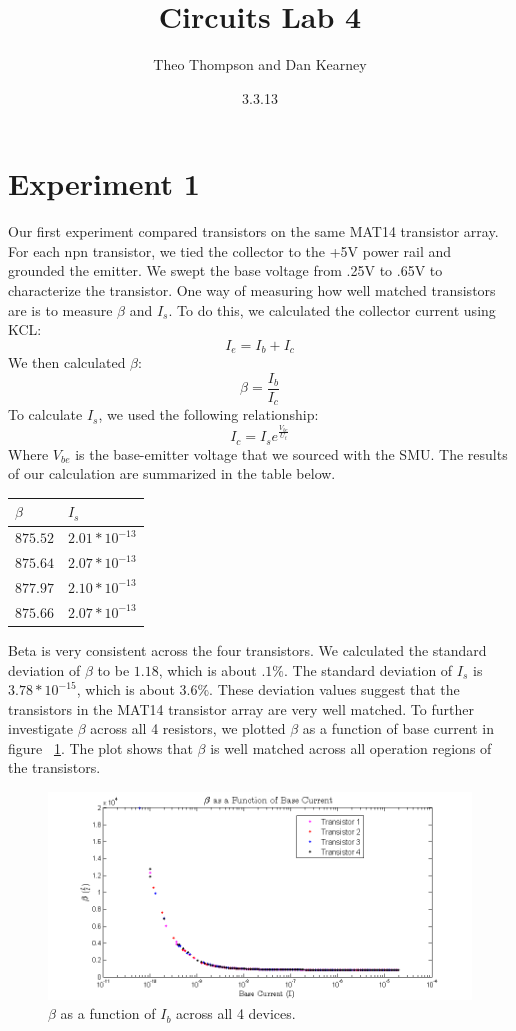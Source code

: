 \documentclass{article}
\title{Circuits Lab 4}
\author{Theo Thompson and Dan Kearney}
\date{3.3.13}
\begin{document}
\maketitle

\section*{Experiment 1}

Our first experiment compared transistors on the same MAT14 transistor array. For each npn transistor, we tied the collector to the +5V power rail and grounded the emitter. We swept the base voltage from .25V to .65V to characterize the transistor. One way of measuring how well matched transistors are is to measure $\beta$ and $I_{s}$. To do this, we calculated the collector current using KCL: \[I_{e}=I_{b}+I_{c}\]
We then calculated $\beta$:\[\beta=\frac{I_{b}}{I_{c}}\]
To calculate $I_{s}$, we used the following relationship: \[I_{c}=I_{s}e^{\frac{V_{be}}{U_{t}}}\]
Where $V_{be}$ is the base-emitter voltage that we sourced with the SMU. The results of our calculation are summarized in the table below.
\begin{center}
    \begin{tabular}{| l | l |} \hline
    $\beta$ & $I_{s}$ \\ \hline \hline
    $875.52$ & $2.01*10^{-13}$ \\ \hline
    $875.64$ & $2.07*10^{-13}$\\ \hline
    $877.97$ & $2.10*10^{-13}$ \\ \hline
    $875.66$ & $2.07*10^{-13}$ \\ \hline
    \end{tabular}
\end{center}

Beta is very consistent across the four transistors. We calculated the standard deviation of $\beta$ to be $1.18$, which is about $.1\%$. The standard deviation of $I_{s}$ is $3.78*10^{-15}$, which is about $3.6\%$. These deviation values suggest that the transistors in the MAT14 transistor array are very well matched. To further investigate $\beta$ across all 4 resistors, we plotted $\beta$ as a function of base current in figure ~\ref{fig:exp1c}. The plot shows that $\beta$ is well matched across all operation regions of the transistors.
\begin{figure}[H]
\begin{center}
\includegraphics[scale=.8]{exp1c.png}
\caption{$\beta$ as a function of $I_{b}$ across all 4 devices.}
\label{fig:exp1c}
\end{center}
\end{figure}
\end{document}

